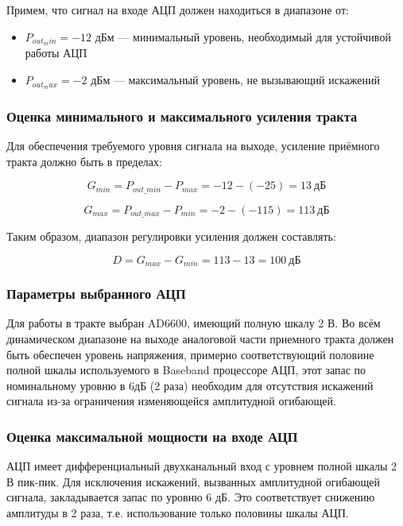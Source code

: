 \documentclass[a4paper,12pt]{article}
\begin{document}
Примем, что сигнал на входе АЦП должен находиться в диапазоне от:
\begin{itemize}
\item $P_{out_min} = -12$ дБм — минимальный уровень, необходимый для устойчивой работы АЦП
\item $P_{out_max} = -2$ дБм — максимальный уровень, не вызывающий искажений
\end{itemize}

\subsubsection{Оценка минимального и максимального усиления тракта}

Для обеспечения требуемого уровня сигнала на выходе, усиление приёмного тракта должно быть в пределах:

\begin{equation}
G_{min} = P_{out\_min} - P_{max} = -12 - (-25) = 13\ \text{дБ}
\end{equation}

\begin{equation}
G_{max} = P_{out\_max} - P_{min} = -2 - (-115) = 113\ \text{дБ}
\end{equation}

Таким образом, диапазон регулировки усиления должен составлять:

\begin{equation}
D = G_{max} - G_{min} = 113 - 13 = 100\ \text{дБ}
\end{equation}

\subsubsection{Параметры выбранного АЦП}
Для работы в тракте выбран AD6600, имеющий полную шкалу 2 В. Во всём динамическом диапазоне на выходе аналоговой части приемного тракта должен быть обеспечен уровень напряжения, примерно соответствующий половине полной шкалы используемого в Baseband процессоре АЦП, этот запас по номинальному уровню в 6дБ (2 раза) необходим для отсутствия искажений сигнала из-за ограничения изменяющейся амплитудной огибающей.  


\subsubsection{Оценка максимальной мощности на входе АЦП}
АЦП имеет дифференциальный двухканальный вход с уровнем полной шкалы 2 В пик-пик. Для исключения искажений, вызванных амплитудной огибающей сигнала, закладывается запас по уровню 6 дБ. Это соответствует снижению амплитуды в 2 раза, т.е. использование только половины шкалы АЦП.
\end{document}
